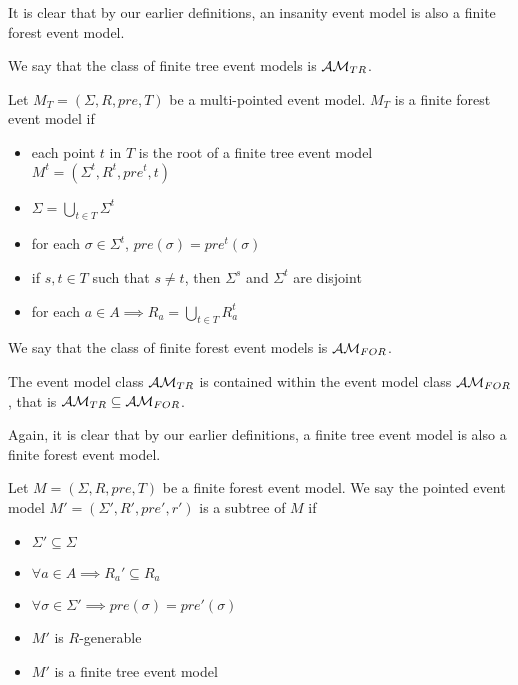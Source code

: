 It is clear that by our earlier definitions, an insanity event model is also a finite forest event
model.

We say that the class of finite tree event models is $\mathcal{AM}_{TR}$.

\begin{defn} \label{forest}
Let $M_T = (\Sigma, R, pre, T)$ be a multi-pointed event model.
$M_T$ is a finite forest event model if
\begin{itemize}
	\item each point $t$ in $T$ is the root of a finite tree event model $M^t = (\Sigma^t, R^t,
	pre^t, t)$
  \item $\Sigma = \bigcup_{t \in T} \Sigma^t$
	\item for each $\sigma \in \Sigma^t$, $pre(\sigma) = pre^t(\sigma)$
	\item if $s, t \in T$ such that $s \neq t$, then $\Sigma^s$ and $\Sigma^t$ are disjoint
  \item for each $a \in A \implies R_a = \bigcup_{t \in T} R_a^t$
\end{itemize}
\end{defn}

We say that the class of finite forest event models is $\mathcal{AM}_{FOR}$.

\begin{lemma} \label{treeIsForest}
The event model class $\mathcal{AM}_{TR}$ is contained within the event model class
$\mathcal{AM}_{FOR}$, that is $\mathcal{AM}_{TR} \subseteq \mathcal{AM}_{FOR}$.
\end{lemma}

Again, it is clear that by our earlier definitions, a finite tree event model is also a finite forest event
model.

\begin{defn} \label{subtree}
Let $M = (\Sigma, R, pre, T)$ be a finite forest event model.
We say the pointed event model $M' = (\Sigma', R', pre', r')$ is a subtree of $M$ if
\begin{itemize}
	\item $\Sigma' \subseteq \Sigma$
	\item $\forall a \in A \implies R_a' \subseteq R_a$
	\item $\forall \sigma \in \Sigma' \implies pre(\sigma) = pre'(\sigma) $
	\item $M'$ is $R$-generable
	\item $M'$ is a finite tree event model
\end{itemize}
\end{defn}

